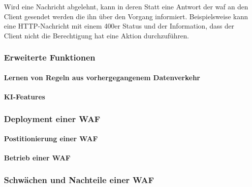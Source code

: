 Wird eine Nachricht abgelehnt, kann in deren Statt eine Antwort der \ac{waf} an den Client gesendet werden die ihn über den Vorgang informiert.
Beispielsweise kann eine HTTP-Nachricht mit einem 400er Status und der Information, dass der Client nicht die Berechtigung hat eine Aktion durchzuführen.

\subsubsection{Erweiterte Funktionen}
\paragraph{Lernen von Regeln aus vorhergegangenem Datenverkehr}
\paragraph{KI-Features}
\subsubsection{Deployment einer WAF}
\paragraph{Postitionierung einer WAF}
\paragraph{Betrieb einer WAF}
\subsubsection{Schwächen und Nachteile einer WAF}
